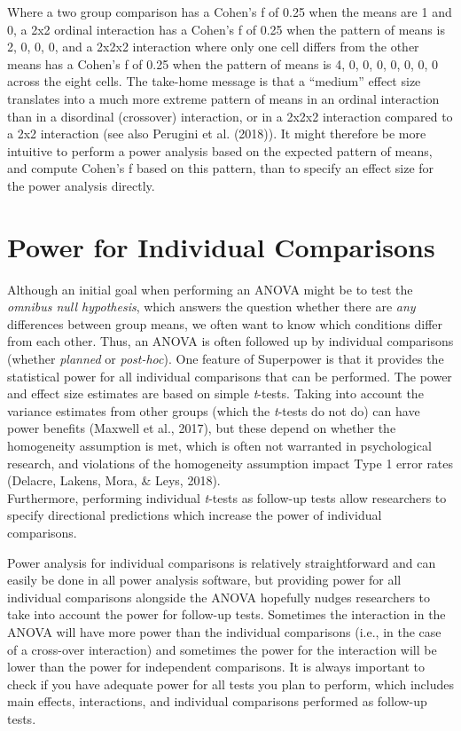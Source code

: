 \documentclass[
  ,jou,floatsintext]{apa6}
\begin{document}
Where a two group comparison has a Cohen's f of 0.25 when the means are 1 and 0, a 2x2 ordinal interaction has a Cohen's f of 0.25 when the pattern of means is 2, 0, 0, 0, and a 2x2x2 interaction where only one cell differs from the other means has a Cohen's f of 0.25 when the pattern of means is 4, 0, 0, 0, 0, 0, 0, 0 across the eight cells.
The take-home message is that a \enquote{medium} effect size translates into a much more extreme pattern of means in an ordinal interaction than in a disordinal (crossover) interaction, or in a 2x2x2 interaction compared to a 2x2 interaction (see also Perugini et al. (2018)).
It might therefore be more intuitive to perform a power analysis based on the expected pattern of means, and compute Cohen's f based on this pattern, than to specify an effect size for the power analysis directly.

\hypertarget{power-for-individual-comparisons}{%
\section{Power for Individual Comparisons}\label{power-for-individual-comparisons}}

Although an initial goal when performing an ANOVA might be to test the \emph{omnibus null hypothesis}, which answers the question whether there are \emph{any} differences between group means, we often want to know which conditions differ from each other. Thus, an ANOVA is often followed up by individual comparisons (whether \emph{planned} or \emph{post-hoc}).
One feature of Superpower is that it provides the statistical power for all individual comparisons that can be performed.
The power and effect size estimates are based on simple \emph{t}-tests.
Taking into account the variance estimates from other groups (which the \emph{t}-tests do not do) can have power benefits (Maxwell et al., 2017), but these depend on whether the homogeneity assumption is met, which is often not warranted in psychological research, and violations of the homogeneity assumption impact Type 1 error rates (Delacre, Lakens, Mora, \& Leys, 2018).\\
Furthermore, performing individual \emph{t}-tests as follow-up tests allow researchers to specify directional predictions which increase the power of individual comparisons.

Power analysis for individual comparisons is relatively straightforward and can easily be done in all power analysis software, but providing power for all individual comparisons alongside the ANOVA hopefully nudges researchers to take into account the power for follow-up tests.
Sometimes the interaction in the ANOVA will have more power than the individual comparisons (i.e., in the case of a cross-over interaction) and sometimes the power for the interaction will be lower than the power for independent comparisons.
It is always important to check if you have adequate power for all tests you plan to perform, which includes main effects, interactions, and individual comparisons performed as follow-up tests.
\end{document}
